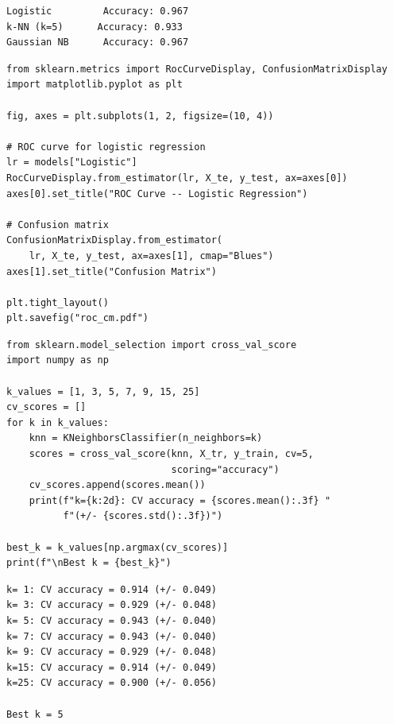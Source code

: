\begin{codeoutput}
\begin{verbatim}
Logistic         Accuracy: 0.967
k-NN (k=5)      Accuracy: 0.933
Gaussian NB      Accuracy: 0.967
\end{verbatim}
\end{codeoutput}

\begin{codeblock}[title=\textbf{ROC Curve and Confusion Matrix}]
\begin{verbatim}
from sklearn.metrics import RocCurveDisplay, ConfusionMatrixDisplay
import matplotlib.pyplot as plt

fig, axes = plt.subplots(1, 2, figsize=(10, 4))

# ROC curve for logistic regression
lr = models["Logistic"]
RocCurveDisplay.from_estimator(lr, X_te, y_test, ax=axes[0])
axes[0].set_title("ROC Curve -- Logistic Regression")

# Confusion matrix
ConfusionMatrixDisplay.from_estimator(
    lr, X_te, y_test, ax=axes[1], cmap="Blues")
axes[1].set_title("Confusion Matrix")

plt.tight_layout()
plt.savefig("roc_cm.pdf")
\end{verbatim}
\end{codeblock}

\begin{codeblock}[title=\textbf{Cross-Validation for k-NN}]
\begin{verbatim}
from sklearn.model_selection import cross_val_score
import numpy as np

k_values = [1, 3, 5, 7, 9, 15, 25]
cv_scores = []
for k in k_values:
    knn = KNeighborsClassifier(n_neighbors=k)
    scores = cross_val_score(knn, X_tr, y_train, cv=5,
                             scoring="accuracy")
    cv_scores.append(scores.mean())
    print(f"k={k:2d}: CV accuracy = {scores.mean():.3f} "
          f"(+/- {scores.std():.3f})")

best_k = k_values[np.argmax(cv_scores)]
print(f"\nBest k = {best_k}")
\end{verbatim}
\end{codeblock}

\begin{codeoutput}
\begin{verbatim}
k= 1: CV accuracy = 0.914 (+/- 0.049)
k= 3: CV accuracy = 0.929 (+/- 0.048)
k= 5: CV accuracy = 0.943 (+/- 0.040)
k= 7: CV accuracy = 0.943 (+/- 0.040)
k= 9: CV accuracy = 0.929 (+/- 0.048)
k=15: CV accuracy = 0.914 (+/- 0.049)
k=25: CV accuracy = 0.900 (+/- 0.056)

Best k = 5
\end{verbatim}
\end{codeoutput}

